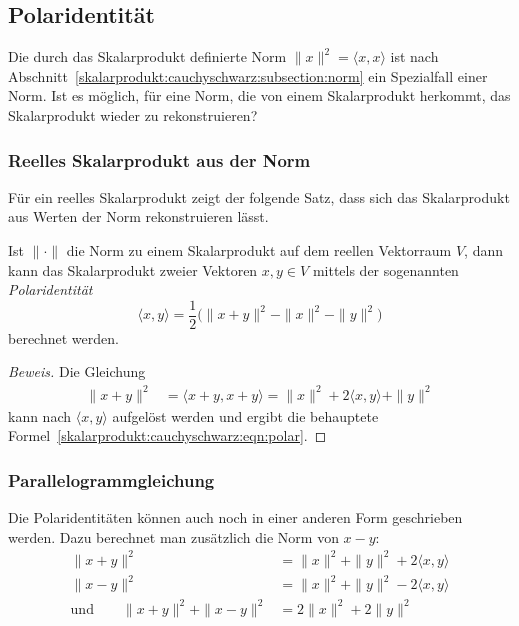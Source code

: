 %
%
\subsection{Polaridentität}
Die durch das Skalarprodukt definierte Norm
\( \|x\|^2=\langle x,x\rangle \)
ist nach Abschnitt~\ref{skalarprodukt:cauchyschwarz:subsection:norm}
ein Spezialfall einer Norm.
Ist es möglich, für eine Norm, die von einem Skalarprodukt herkommt,
das Skalarprodukt wieder zu rekonstruieren?

%
%
\subsubsection{Reelles Skalarprodukt aus der Norm}
Für ein reelles Skalarprodukt zeigt der folgende Satz, dass sich
das Skalarprodukt aus Werten der Norm rekonstruieren lässt.

\begin{satz}[Polaridentität]
\label{skalarprodukt:cauchyschwarz:satz:polarformel}
%
Ist $\|\cdot\|$ die Norm zu einem Skalarprodukt auf dem reellen Vektorraum
$V$, dann kann das Skalarprodukt zweier Vektoren $x,y\in V$ mittels
der sogenannten {\em Polaridentität}
%
\begin{equation}
\langle x, y\rangle
=
\frac12\bigl(
\|x+y\|^2 - \|x\|^2 - \|y\|^2 
\bigr)
\label{skalarprodukt:cauchyschwarz:eqn:polar}
\end{equation}
berechnet werden.
\end{satz}

\begin{proof}[Beweis]
Die Gleichung
\begin{align*}
\|x+y\|^2
&=
\langle x+y,x+y\rangle
=
\|x\|^2 + 2\langle x,y\rangle + \|y\|^2 
\end{align*}
kann nach $\langle x,y\rangle$ aufgelöst werden und ergibt
die behauptete Formel~\eqref{skalarprodukt:cauchyschwarz:eqn:polar}.
\end{proof}

% 
%
\subsubsection{Parallelogrammgleichung}

Die Polaridentitäten können auch noch in einer anderen Form geschrieben
werden.
Dazu berechnet man zusätzlich die Norm von $x-y$:
\begin{align*}
\|x+y\|^2
&=
\|x\|^2 + \|y\|^2 + 2\langle x, y\rangle
\\
\|x-y\|^2
&=
\|x\|^2 + \|y\|^2 - 2\langle x, y\rangle
\\
\text{und}\qquad
\|x+y\|^2 +\|x-y\|^2
&=
2\|x\|^2 + 2\|y\|^2
\end{align*}

